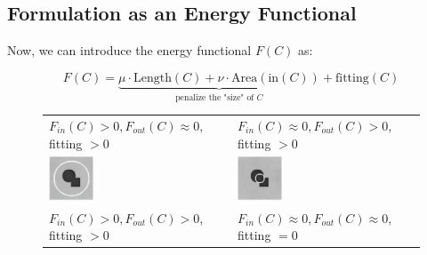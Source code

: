 \documentclass[journal]{IEEEtran}
\begin{document}
\subsection{Formulation as an Energy Functional}
Now, we can introduce the energy functional \( F(C) \) as:

\begin{equation}\label{eq:energy-functional-simplified}
    F(C) = \underbrace{\mu \cdot \textrm{Length}(C) + \nu \cdot \textrm{Area}(\textrm{in}(C))}_{\text{penalize the "size" of $C$}} + \textrm{fitting}(C)
\end{equation}

\begin{figure}[!t]
    \centering
    \begin{tabular}{@{}>{\centering\arraybackslash} m{} @{} >{\centering\arraybackslash} m{} @{}}
        \small $F_{in}(C) > 0, F_{out}(C) \approx 0$, \, \, fitting $> 0$                                                    & \small $F_{in}(C) \approx 0, F_{out}(C) > 0$, \, \, fitting $> 0$                                                     \\
        \includegraphics[width=0.25\textwidth,height=0.25\textheight,keepaspectratio]{images/fitting-problem-upper-left.png} & \includegraphics[width=0.25\textwidth,height=0.25\textheight,keepaspectratio]{images/fitting-problem-upper-right.png} \\
        \small $F_{in}(C) > 0, F_{out}(C) > 0$, \, \, fitting $> 0$                                                          & \small $F_{in}(C) \approx 0, F_{out}(C) \approx 0$, \, \, fitting $= 0$                                               \\

\end{tabular}
\end{figure}
\end{document}
